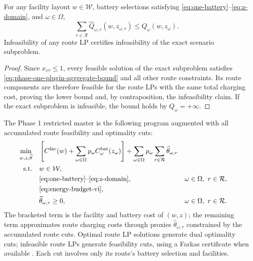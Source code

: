 \begin{proposition}
\label{prop:phase-one-lb}
For any facility layout $w\in\mathcal W$, battery selections satisfying \eqref{eq:one-battery}--\eqref{eq:z-domain}, and $\omega\in\Omega$,
\begin{equation}
 \sum_{r\in\mathcal R}\widehat Q_{\omega,r}(w,z_{\omega,r})\le Q_\omega(w,z_\omega).
\label{eq:phase-one-lb}
\end{equation}
Infeasibility of any route LP certifies infeasibility of the exact scenario subproblem.
\end{proposition}
\begin{proof}
Since $x_{v\tau}\le1$, every feasible solution of the exact subproblem satisfies \eqref{eq:phase-one-plugin-aggregate-bound} and all other route constraints.
Its route components are therefore feasible for the route LPs with the same total charging cost, proving the lower bound and, by contraposition, the infeasibility claim.
If the exact subproblem is infeasible, the bound holds by $Q_\omega=+\infty$.
\end{proof}

The Phase 1 restricted master is the following program augmented with all accumulated route feasibility and optimality cuts:
\begin{equation}
\begin{aligned}
 \min_{w,z,\widehat\theta}\quad
 &\left[C^{\mathrm{fac}}(w)+\sum_{\omega\in\Omega}p_\omega
 C_\omega^{\mathrm{bat}}(z_\omega)\right]
 +\sum_{\omega\in\Omega}p_\omega\sum_{r\in\mathcal R}\widehat\theta_{\omega,r}\\
 \mathrm{s.t.}\quad &w\in\mathcal W,\\
 &\eqref{eq:one-battery}\text{--}\eqref{eq:z-domain}, &&\omega\in\Omega,\ r\in\mathcal R,\\
 &\eqref{eq:energy-budget-vi},\\
 &\widehat\theta_{\omega,r}\ge0, &&\omega\in\Omega,\ r\in\mathcal R.
\end{aligned}
\label{eq:phase-one-master}
\end{equation}
The bracketed term is the facility and battery cost of $(w,z)$; the remaining term approximates route charging costs through proxies $\widehat\theta_{\omega,r}$ constrained by the accumulated route cuts.
Optimal route LP solutions generate dual optimality cuts; infeasible route LPs generate feasibility cuts, using a Farkas certificate when available \citep{benders_partitioning_1962}.
Each cut involves only its route's battery selection and facilities.

